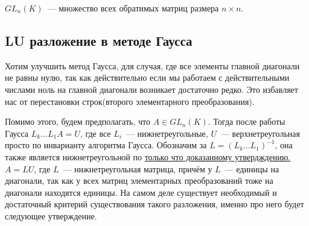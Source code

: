 \begin{definition}
    $GL_n(K)$~--- множество всех обратимых матриц размера $n\times n$.
\end{definition}
\subsection{LU разложение в методе Гаусса}
Хотим улучшить метод Гаусса, для случая, где все элементы главной
диагонали не равны нулю, так как действительно если мы работаем с действительными числами ноль на главной
диагонали возникает достаточно редко. Это избавляет нас от перестановки строк(второго элементарного преобразования).

Помимо этого, будем предполагать, что $A\in GL_n(K)$.
Тогда после работы Гаусса $L_k\ldots L_1A = U$, где все $L_i$~--- нижнетреугольные,
$U$~--- верхнетреугольная просто по инварианту алгоритма Гаусса.
Обозначим за $L = (L_k\ldots L_1)^{-1}$, она также является нижнетреугольной по 
\hyperref[stm:Обратная матрица к нижнетреугольной также нижнетреугольная]{только что доказанному утвердждению.}
$A = LU$, где $L$~--- нижнетреугольная матрица, причём у $L$~--- единицы на диагонали, так как у всех матриц элементарных
преобразований тоже на диагонали находятся единицы.
На самом деле существует необходимый и достаточный критерий существования такого разложения, именно про него будет
следующее утверждение.

